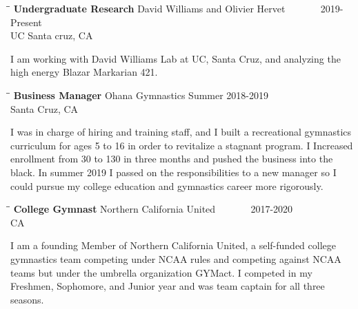 \documentclass{res}
\begin{document}
\begin{resume}
\begin{tabbing}%
   \hspace{2.3in}\= \hspace{2.6in}\= \kill %
   {\bf Undergraduate Research}  \>David Williams and Olivier Hervet \> ~~~~~~ 2019-Present\\
                          \>UC Santa cruz, CA
   \end{tabbing}\vspace{-20pt}
   I am working with David Williams Lab at UC, Santa Cruz, and analyzing the high energy Blazar Markarian 421.

   
   \begin{tabbing}
   \hspace{2.3in}\= \hspace{2.6in}\= \kill %
    {\bf Business Manager} \>Ohana Gymnastics     \>Summer 2018-2019\\
                             \>Santa Cruz, CA
   \end{tabbing}\vspace{-20pt}      %
    I was in charge of hiring and training staff, and I built a recreational gymnastics curriculum for ages 5 to 16 in order to revitalize a stagnant program. I Increased enrollment from 30 to 130 in three months and pushed the business into the black. In summer 2019 I passed on the responsibilities to a new manager so I could pursue my college education and gymnastics career more rigorously. 
    
   \begin{tabbing}
   \hspace{2.3in}\= \hspace{2.6in}\= \kill %
    {\bf College Gymnast} \>Northern California United \> ~~~~~~ 2017-2020\\
                          \>CA
   \end{tabbing}\vspace{-20pt}
    I am a founding Member of Northern California United, a self-funded college gymnastics team competing under NCAA rules and competing against NCAA teams but under the umbrella organization GYMact. I competed in my Freshmen, Sophomore, and  Junior year and was team captain for all three seasons.
    

\end{resume}
\end{document}

